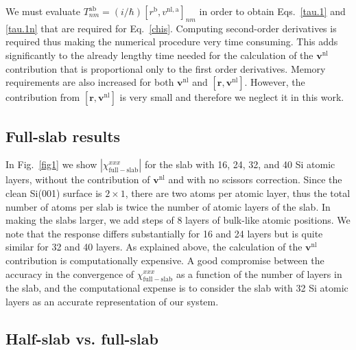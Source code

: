 We must evaluate $T^{\mathrm{a}\mathrm{b}}_{nm}=(i/\hbar)[r^\mathrm{b},v^{\mathrm{nl},\mathrm{a}}]_{nm}$ in order to obtain Eqs.~\eqref{tau.1} and
\eqref{tau.1n} that are required for Eq.~\eqref{chis}. Computing second-order
derivatives is required thus making the numerical procedure very time consuming.
This adds significantly to the already lengthy time needed for the calculation
of the $\mathbf{v}^\mathrm{nl}$ contribution that is proportional only to the
first order derivatives. Memory requirements are also increased for both
$\mathbf{v}^\mathrm{nl}$ and $[\mathbf{r},\mathbf{v}^\mathrm{nl}]$. However, the
contribution from $[\mathbf{r},\mathbf{v}^\mathrm{nl}]$ is very
small\cite{valerie} and therefore we neglect it in this work.


\subsection{Full-slab results}\label{fsresults}

In Fig.~\ref{fig1} we show $|\chi_{\mathrm{full-slab}}^{xxx}|$ for the slab with
16, 24, 32, and 40 Si atomic layers, without the contribution of
$\mathbf{v}^{\mathrm{nl}}$ and with no scissors correction. Since the clean
Si(001) surface is $2\times 1$, there are two atoms per atomic layer, thus the
total number of atoms per slab is twice the number of atomic layers of the slab.
In making the slabs larger, we add steps of 8 layers of bulk-like atomic
positions. We note that the response differs substantially for 16 and 24 layers
but is quite similar for 32 and 40 layers. As explained above, the calculation
of the $\mathbf{v}^\mathrm{nl}$ contribution is computationally expensive. A
good compromise between the accuracy in the convergence of
$\chi^{xxx}_{\mathrm{full-slab}}$ as a function of the number of layers in the
slab, and the computational expense is to consider the slab with 32 Si atomic
layers as an accurate representation of our system.


\subsection{Half-slab vs. full-slab}

